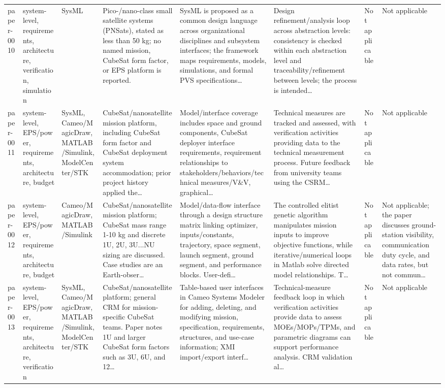 \documentclass[10pt]{article}
\begin{document}
\begin{landscape}
\begin{longtable}{p{1.1cm}p{3.1cm}p{2.5cm}p{3.3cm}p{4.0cm}p{3.5cm}p{2.8cm}p{2.8cm}}
paper-0010 & system-level, requirements, architecture, verification, simulation & SysML & Pico-/nano-class small satellite systems (PNSats), stated as less than 50 kg; no named mission, CubeSat form factor, or EPS platform is reported. & SysML is proposed as a common design language across organizational disciplines and subsystem interfaces; the framework maps requirements, models, simulations, and formal PVS specifications… & Design refinement/analysis loop across abstraction levels: consistency is checked within each abstraction level and traceability/refinement between levels; the process is intended… & Not applicable & Not applicable \\
paper-0011 & system-level, EPS/power, requirements, architecture, budget & SysML, Cameo/MagicDraw, MATLAB/Simulink, ModelCenter/STK & CubeSat/nanosatellite mission platform, including CubeSat form factor and CubeSat deployment system accommodation; prior project history applied the… & Model/interface coverage includes space and ground components, CubeSat deployer interface requirements, requirement relationships to stakeholders/behaviors/technical measures/V\&V, graphical… & Technical measures are tracked and assessed, with verification activities providing data to the technical measurement process. Future feedback from university teams using the CSRM… & Not applicable & Not applicable \\
paper-0012 & system-level, EPS/power, requirements, architecture, budget & Cameo/MagicDraw, MATLAB/Simulink & CubeSat/nanosatellite mission platform; CubeSat mass range 1-10 kg and discrete 1U, 2U, 3U...NU sizing are discussed. Case studies are an Earth-obser… & Model/data-flow interface through a design structure matrix linking optimizer, inputs/constants, trajectory, space segment, launch segment, ground segment, and performance blocks. User-defi… & The controlled elitist genetic algorithm manipulates mission inputs to improve objective functions, while iterative/numerical loops in Matlab solve directed model relationships. T… & Not applicable & Not applicable; the paper discusses ground-station visibility, communication duty cycle, and data rates, but not commun… \\
paper-0013 & system-level, EPS/power, requirements, architecture, verification & SysML, Cameo/MagicDraw, MATLAB/Simulink, ModelCenter/STK & CubeSat/nanosatellite platform; general CRM for mission-specific CubeSat teams. Paper notes 1U and larger CubeSat form factors such as 3U, 6U, and 12… & Table-based user interfaces in Cameo Systems Modeler for adding, deleting, and modifying mission, specification, requirements, structures, and use-case information; XMI import/export interf… & Technical-measure feedback loop in which verification activities provide data to assess MOEs/MOPs/TPMs, and parametric diagrams can support performance analysis. CRM validation al… & Not applicable & Not applicable \\

\end{longtable}
\end{landscape}
\end{document}
